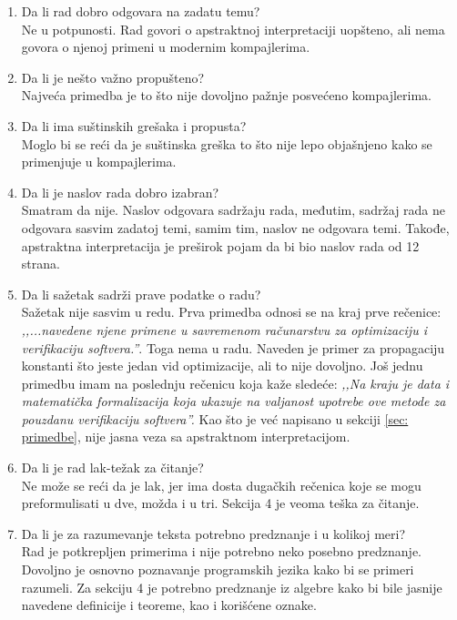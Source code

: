 \documentclass[a4paper]{report}
\begin{document}
\begin{enumerate}
\item Da li rad dobro odgovara na zadatu temu?\\
	\noindent Ne u potpunosti. Rad govori o apstraktnoj interpretaciji uopšteno, ali nema govora o njenoj primeni u modernim kompajlerima.

\item Da li je nešto važno propušteno?\\
	\noindent Najveća primedba je to što nije dovoljno pažnje posvećeno kompajlerima.

\item Da li ima suštinskih grešaka i propusta?\\
	\noindent Moglo bi se reći da je suštinska greška to što nije lepo objašnjeno kako se primenjuje u kompajlerima.

\item Da li je naslov rada dobro izabran?\\
	\noindent Smatram da nije. Naslov odgovara sadržaju rada, međutim, sadržaj rada ne odgovara sasvim zadatoj temi, samim tim, naslov ne odgovara temi. Takođe, apstraktna interpretacija je preširok pojam da bi bio naslov rada od 12 strana.

\item Da li sažetak sadrži prave podatke o radu?\\
	\noindent Sažetak nije sasvim u redu. Prva primedba odnosi se na kraj prve rečenice: \textit{‚‚...navedene njene primene u savremenom računarstvu za optimizaciju i verifikaciju softvera.''}. Toga nema u radu. Naveden je primer za propagaciju konstanti što jeste jedan vid optimizacije, ali to nije dovoljno. Još jednu primedbu imam na poslednju rečenicu koja kaže sledeće: \textit{‚‚Na kraju je data i matematička formalizacija koja ukazuje na valjanost upotrebe ove metode za pouzdanu verifikaciju softvera''.} Kao što je već napisano u sekciji \ref{sec: primedbe}, nije jasna veza sa apstraktnom interpretacijom.

\item Da li je rad lak-težak za čitanje?\\
	\noindent Ne može se reći da je lak, jer ima dosta dugačkih rečenica koje se mogu preformulisati u dve, možda i u tri. Sekcija 4 je veoma teška za čitanje. 

\item Da li je za razumevanje teksta potrebno predznanje i u kolikoj meri?\\
	\noindent Rad je potkrepljen primerima i nije potrebno neko posebno predznanje. Dovoljno je osnovno poznavanje programskih jezika kako bi se primeri razumeli. Za sekciju 4 je potrebno predznanje iz algebre kako bi bile jasnije navedene definicije i teoreme, kao i korišćene oznake.


\end{enumerate}
\end{document}
